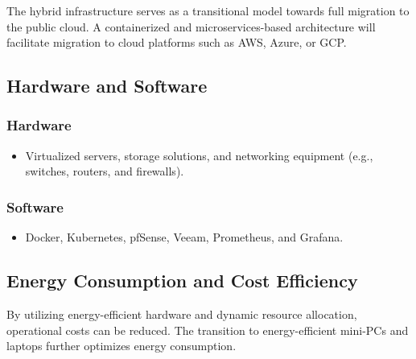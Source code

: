 The hybrid infrastructure serves as a transitional model towards full migration to the public cloud. A containerized and microservices-based architecture will facilitate migration to cloud platforms such as AWS, Azure, or GCP.

\subsection{Hardware and Software}

\subsubsection{Hardware} \begin{itemize} \item Virtualized servers, storage solutions, and networking equipment (e.g., switches, routers, and firewalls). \end{itemize}

\subsubsection{Software} \begin{itemize} \item Docker, Kubernetes, pfSense, Veeam, Prometheus, and Grafana. \end{itemize}

\subsection{Energy Consumption and Cost Efficiency}

By utilizing energy-efficient hardware and dynamic resource allocation, operational costs can be reduced. The transition to energy-efficient mini-PCs and laptops further optimizes energy consumption.
